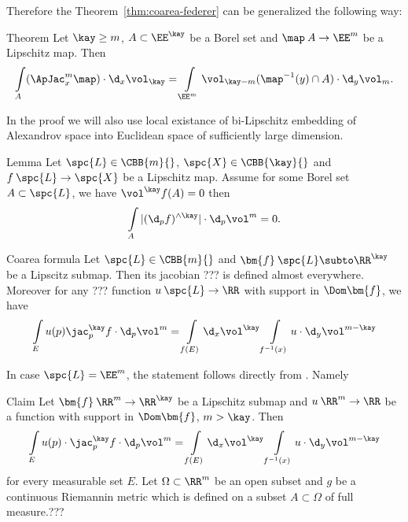 Therefore the Theorem~\ref{thm:coarea-federer} can be generalized the following way:

\begin{thm}{Theorem}\label{thm:coarea-ApD}
Let $\kay\ge m$,
$A\subset \EE^\kay$ be a Borel set 
and $\map\:A\to\EE^m$ be a Lipschitz map.
Then 
$$\int\limits_A(\ApJac^m_x\map)\cdot\d_x\vol_\kay
=
\int\limits_{\EE^m}\vol_{\kay-m}(\map^{-1}(y)\cap A)\cdot\d_y\vol_m.$$
\end{thm}

In the proof we will also use 
local existance of bi-Lipschitz embedding 
of Alexandrov space into Euclidean space 
of sufficiently large dimension.

\begin{thm}{Lemma}
Let $\spc{L}\in\CBB{m}{}$, 
$\spc{X}\in\CBB{\kay}{}$
and $f\:\spc{L}\to\spc{X}$ be a Lipschitz map.
Assume for some Borel set $A\subset \spc{L}$, 
we have $\vol^\kay f(A)=0$ then 
$$\int\limits_A|(\d_pf)^{\wedge\kay}|\cdot\d_p\vol^m=0.$$

\end{thm}










\begin{thm}{Coarea formula} Let $\spc{L}\in\CBB{m}{}$ and $\bm{f}\:\spc{L}\subto\RR^\kay$ be a Lipscitz submap.
Then its jacobian ??? is defined almost everywhere.
Moreover for any ??? function $u\:\spc{L}\to\RR$ with support in $\Dom \bm{f}$,
we have 
$$\int\limits_E u(p) \jac_p^\kay f\cdot\d_p\vol^m
=
\int\limits_{f(E)}\d_x\vol^\kay
\int\limits_{f^{-1}(x)}u\cdot\d_y\vol^{m-\kay}$$
\end{thm}

 In case $\spc{L}=\EE^m$, the statement follows directly from  \cite[3.2.11]{federer}. 
Namely

\begin{clm}{Claim}\label{coarea-Rn} 
Let $\bm{f}\: \RR^m\to\RR^\kay$ be a Lipschitz submap and $u\:\RR^m\to\RR$ be a function with support in $\Dom\bm{f}$, $m>\kay$. 
Then
$$\int\limits_E u(p)\cdot\jac_p^\kay f\cdot\d_p\vol^m
=
\int\limits_{f(E)}\d_x\vol^\kay
\int\limits_{f^{-1}(x)}u\cdot\d_y\vol^{m-\kay}$$
for every measurable set $E$.
Let $\Omega\subset \RR^m$ be an open subset and $g$
 be a continuous Riemannin metric which is defined on a subset $A\subset \Omega$ of full measure.???
\end{clm}

